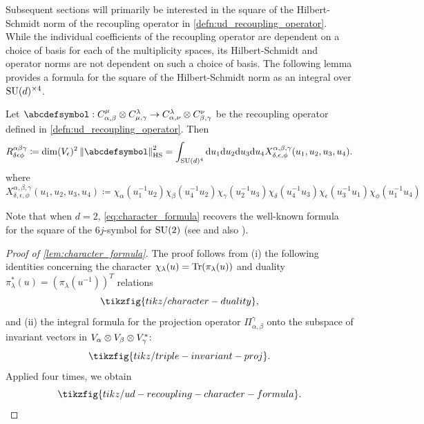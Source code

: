 \documentclass[notitlepage, 10pt]{article}
\begin{document}
Subsequent sections will primarily be interested in the square of the Hilbert-Schmidt norm of the recoupling operator in \cref{defn:ud_recoupling_operator}.
While the individual coefficients of the recoupling operator are dependent on a choice of basis for each of the multiplicity spaces, its Hilbert-Schmidt and operator norms are not dependent on such a choice of basis.
The following lemma provides a formula for the square of the Hilbert-Schmidt norm as an integral over $\operatorname{SU}(d)^{\times 4}$.
\begin{lem}
    \label{lem:character_formula}
    Let $\abcdefsymbol : C^{\mu}_{\alpha,\beta} \ot C^{\lambda}_{\mu,\gamma} \to C^{\lambda}_{\alpha, \nu} \ot C^{\nu}_{\beta,\gamma}$ be the recoupling operator defined in \cref{defn:ud_recoupling_operator}.
    Then
    \begin{equation}
        \label{eq:character_formula}
        R^{\alpha\beta\gamma}_{\delta\epsilon\phi} \coloneqq
        \dim(V_{\epsilon})^{2}\norm{\abcdefsymbol}_{\mathrm{HS}}^{2}
        = \int_{\SU(d)^{4}} \diff u_1 \diff u_2 \diff u_3 \diff u_4 X^{\alpha,\beta,\gamma}_{\delta,\epsilon,\phi}(u_1,u_2,u_3,u_4).
    \end{equation}
    where
    \begin{equation}
        X^{\alpha,\beta,\gamma}_{\delta,\epsilon,\phi}(u_1,u_2,u_3,u_4) \coloneqq \chi_{\alpha}(u_1^{-1}u_2)\chi_{\beta}(u_4^{-1}u_2)\chi_{\gamma}(u_2^{-1}u_3)\chi_{\delta}(u_4^{-1}u_3)\chi_{\epsilon}(u_3^{-1}u_1)\chi_{\phi}(u_1^{-1}u_4)
    \end{equation}
\end{lem}
Note that when $d = 2$, \cref{eq:character_formula} recovers the well-known formula for the square of the $6j$-symbol for $\operatorname{SU}(2)$ (see \cite[Equation (1)]{freidel2003asymptotics} and also \cite{barrett1998classical,freidel2000simple}).
\begin{proof}[Proof of \cref{lem:character_formula}]
    The proof follows from (i) the following identities concerning the character $\chi_{\lambda}(u) = \operatorname{Tr}(\pi_{\lambda}(u))$ and duality $\pi_{\lambda}^{*}(u) = (\pi_{\lambda}(u^{-1}))^{T}$ relations
    \begin{equation}
        \tikzfig{tikz/character-duality},
    \end{equation}
    and (ii) the integral formula for the projection operator $\Pi_{\alpha,\beta}^{\gamma}$ onto the subspace of invariant vectors in $V_{\alpha} \otimes V_{\beta} \otimes V_{\gamma}^{*}$:
    \begin{equation}
        \tikzfig{tikz/triple-invariant-proj}.
    \end{equation}
    Applied four times, we obtain
    \begin{equation}
        \tikzfig{tikz/ud-recoupling-character-formula}.
    \end{equation}
\end{proof}
\end{document}
